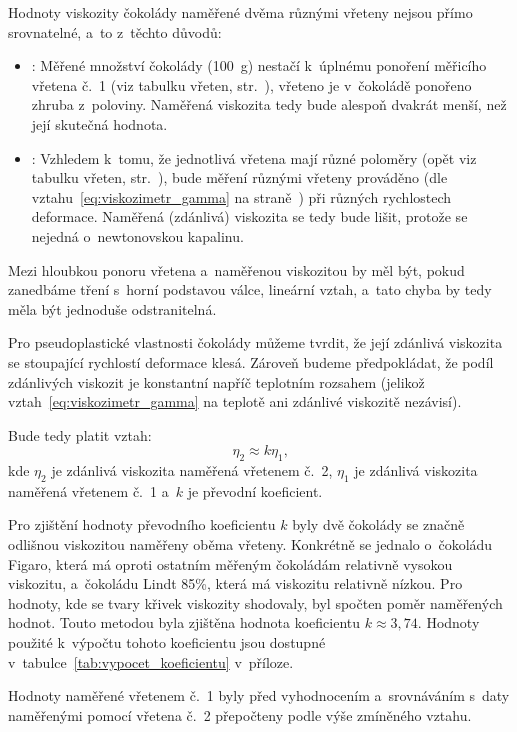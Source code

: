 \documentclass[12pt]{article}
\begin{document}
Hodnoty viskozity čokolády naměřené dvěma různými vřeteny nejsou přímo srovnatelné, a~to z~těchto důvodů:
\begin{itemize}[noitemsep, topsep = 0pt]
    \item \underline{}: Měřené množství čokolády (\SI{100}{\gram}) nestačí k~úplnému ponoření měřicího vřetena č.~1 (viz tabulku vřeten, str.~\pageref{tab:vretena}), vřeteno je v~čokoládě ponořeno zhruba z~poloviny. Naměřená viskozita tedy bude alespoň dvakrát menší, než její skutečná hodnota. 
    \item \underline{}: Vzhledem k~tomu, že jednotlivá vřetena mají různé poloměry (opět viz tabulku vřeten, str.~\pageref{tab:vretena}), bude měření různými vřeteny prováděno (dle vztahu~\ref{eq:viskozimetr_gamma} na straně~\pageref{eq:viskozimetr_gamma}) při různých rychlostech deformace. Naměřená (zdánlivá) viskozita se tedy bude lišit, protože se nejedná o~newtonovskou kapalinu.
\end{itemize}
Mezi hloubkou ponoru vřetena a~naměřenou viskozitou by měl být, pokud zanedbáme tření s~horní podstavou válce, lineární vztah, a~tato chyba by tedy měla být jednoduše odstranitelná.
\par\noindent
Pro pseudoplastické vlastnosti čokolády můžeme tvrdit, že její zdánlivá viskozita se stoupající rychlostí deformace klesá. Zároveň budeme předpokládat, že podíl zdánlivých viskozit je konstantní napříč teplotním rozsahem (jelikož vztah~\ref{eq:viskozimetr_gamma} na teplotě ani zdánlivé viskozitě nezávisí).
\par\noindent
Bude tedy platit vztah:
\begin{equation}
    \eta_2 \approx k\eta_1\text{,}
    \label{eq:prepocet}
\end{equation}
kde $\eta_2$ je zdánlivá viskozita naměřená vřetenem č.~2, $\eta_1$ je zdánlivá viskozita naměřená vřetenem č.~1 a~$k$ je převodní koeficient.
\par\noindent
Pro zjištění hodnoty převodního koeficientu $k$ byly dvě čokolády se značně odlišnou viskozitou naměřeny oběma vřeteny. Konkrétně se jednalo o~čokoládu Figaro, která má oproti ostatním měřeným čokoládám relativně vysokou viskozitu, a~čokoládu Lindt 85\%, která má viskozitu relativně nízkou. Pro hodnoty, kde se tvary křivek viskozity shodovaly, byl spočten poměr naměřených hodnot. Touto metodou byla zjištěna hodnota koeficientu $k\approx 3,74$. Hodnoty použité k~výpočtu tohoto koeficientu jsou dostupné v~tabulce~\ref{tab:vypocet_koeficientu} v~příloze.
\par\noindent
Hodnoty naměřené vřetenem č.~1 byly před vyhodnocením a~srovnáváním s~daty naměřenými pomocí vřetena č.~2 přepočteny podle výše zmíněného vztahu.
\end{document}
